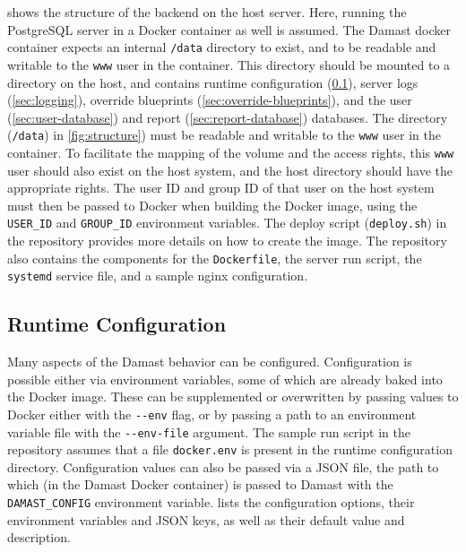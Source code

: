  shows the structure of the backend on the host server.
Here, running the PostgreSQL server in a Docker container as well is assumed.
The Damast docker container expects an internal \verb!/data! directory to exist, and to be readable and writable to the \verb!www! user in the container.
This directory should be mounted to a directory on the host, and contains runtime configuration (\cref{sec:runtime-configuration}), server logs (\cref{sec:logging}), override blueprints (\cref{sec:override-blueprints}), and the user (\cref{sec:user-database}) and report (\cref{sec:report-database}) databases.
The directory (\verb!/data!) in \cref{fig:structure}) must be readable and writable to the \verb!www! user in the container.
To facilitate the mapping of the volume and the access rights, this \verb!www! user should also exist on the host system, and the host directory should have the appropriate rights.
The user ID and group ID of that user on the host system must then be passed to Docker when building the Docker image, using the \verb!USER_ID! and \verb!GROUP_ID! environment variables.
The deploy script (\verb!deploy.sh!) in the repository provides more details on how to create the image.
The repository also contains the components for the \verb!Dockerfile!, the server run script, the \verb!systemd! service file, and a sample nginx configuration.


\subsection{Runtime Configuration}
\label{sec:runtime-configuration}

Many aspects of the Damast behavior can be configured.
Configuration is possible either via environment variables, some of which are already baked into the Docker image.
These can be supplemented or overwritten by passing values to Docker either with the \verb!--env! flag, or by passing a path to an environment variable file with the \verb!--env-file! argument.
The sample run script in the repository assumes that a file \verb!docker.env! is present in the runtime configuration directory.
Configuration values can also be passed via a JSON file, the path to which (in the Damast Docker container) is passed to Damast with the \verb!DAMAST_CONFIG! environment variable.
 lists the configuration options, their environment variables and JSON keys, as well as their default value and description.

\newcommand\configentry[4]{%
    \parbox[t][][t]{7cm}{%
      \texttt{#1} \\
      \ifthenelse{\equal{#2}{}}{---}{\texttt{#2}} \\
      \ifthenelse{\equal{#3}{}}{\emph{no value}}{\texttt{#3}} \vspace{4pt}%
      } & \parbox[t][][t]{9.5cm}{%
        #4 \vspace{4pt}%
      }}

